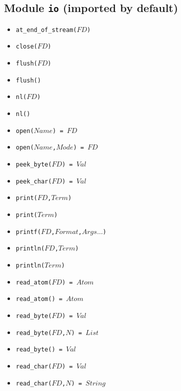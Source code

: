 \documentclass[10pt]{article}
\begin{document}
\begin{multicols}{2}
\section*{Module \texttt{io} (imported by default)}
\begin{scriptsize}
\begin{itemize}
   \item \texttt{at\_end\_of\_stream($FD$)}
   \item \texttt{close($FD$)}
   \item \texttt{flush($FD$)}
   \item \texttt{flush()}
   \item \texttt{nl($FD$)}
   \item \texttt{nl()}
   \item \texttt{open($Name$) = $FD$}
   \item \texttt{open($Name$,$Mode$) = $FD$}
   \item \texttt{peek\_byte($FD$) = $Val$}
   \item \texttt{peek\_char($FD$) = $Val$}
   \item \texttt{print($FD$,$Term$)}
   \item \texttt{print($Term$)}
   \item \texttt{printf($FD$,$Format$,$Args\ldots$)}
   \item \texttt{println($FD$,$Term$)}
   \item \texttt{println($Term$)}
   \item \texttt{read\_atom($FD$) = $Atom$}
   \item \texttt{read\_atom() = $Atom$}
   \item \texttt{read\_byte($FD$) = $Val$}
   \item \texttt{read\_byte($FD$,$N$) = $List$}
   \item \texttt{read\_byte() = $Val$}
   \item \texttt{read\_char($FD$) = $Val$}
   \item \texttt{read\_char($FD$,$N$) = $String$}

\end{itemize}
\end{scriptsize}
\end{multicols}
\end{document}
